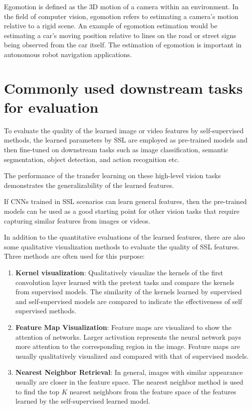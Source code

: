 \begin{center}
      Egomotion is defined as the 3D motion of a camera within an environment.
      In the field of computer vision, egomotion refers to estimating a camera's
      motion relative to a rigid scene. An example of egomotion estimation would
      be estimating a car's moving position relative to lines on the road or street
      signs being observed from the car itself. The estimation of egomotion is
      important in autonomous robot navigation applications.
\end{center}

\section{Commonly used downstream tasks for evaluation}
To evaluate the quality of the learned image or video features by self-supervised
methods, the learned parameters by SSL are employed as pre-trained models and then
fine-tuned on downstream tasks such as image classification, semantic segmentation,
object detection, and action recognition etc.

The performance of the transfer learning on these high-level vision tasks
demonstrates the generalizability of the learned features.

If CNNs trained in SSL scenarios can learn general features, then the pre-trained
models can be used as a good starting point for other vision tasks that require
capturing similar features from images or videos.

In addition to the quantitative evaluations of the learned features, there are
also some qualitative visualization methods to evaluate the quality of SSL features.
Three methods are often used for this purpose:
\begin{enumerate}
      \item \textbf{Kernel visualization}: Qualitatively visualize the kernels of
            the first convolution layer learned with the pretext tasks and compare
            the kernels from supervised models. The similarity of the kernels
            learned by supervised and self-supervised models are compared to
            indicate the effectiveness of self supervised methods.
      \item \textbf{Feature Map Visualization}: Feature maps are visualized to
            show the attention of networks. Larger activation represents the neural
            network pays more attention to the corresponding region in the image.
            Feature maps are usually qualitatively visualized and compared with
            that of supervised models.
      \item \textbf{Nearest Neighbor Retrieval}: In general, images with similar
            appearance usually are closer in the feature space. The nearest
            neighbor method is used to find the top $K$ nearest neighbors from
            the feature space of the features learned by the self-supervised
            learned model.
\end{enumerate}

